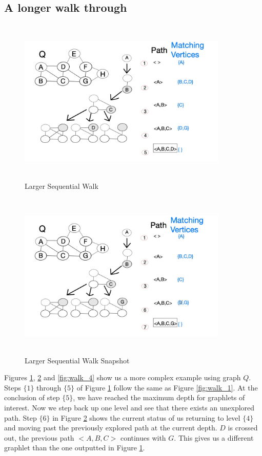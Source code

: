 \documentclass[12pt,twoside]{reedthesis}
\begin{document}
\subsection{A longer walk through} \label{sec:longer_walk}
\begin{figure}[h]
	\centering
	\includegraphics[width=10cm, height=8cm]{seq_walk_2}
	\caption{Larger Sequential Walk}
	\label{fig:walk_2}
\end{figure}

\begin{figure}[h!]
	\centering
	\includegraphics[width=10cm, height=8cm]{seq_walk_3}
	\caption{Larger Sequential Walk Snapshot}
	\label{fig:walk_3} %
\end{figure}
Figures \ref{fig:walk_2}, \ref{fig:walk_3} and \ref{fig:walk_4} show us a more complex example using graph $Q$. Steps $\{1\}$ through $\{5\}$ of Figure \ref{fig:walk_2} follow the same as Figure \ref{fig:walk_1}. At the conclusion of step $\{5\}$, we have reached the maximum depth for graphlets of interest. Now we step back up one level and see that there exists an unexplored path. Step $\{6\}$ in Figure \ref{fig:walk_3} shows the current status of us returning to level $\{4\}$ and moving past the previously explored path at the current depth. $D$ is crossed out, the previous path $<A,B,C>$ continues with $G$. This gives us a different graphlet than the one outputted in Figure \ref{fig:walk_2}.
\end{document}
